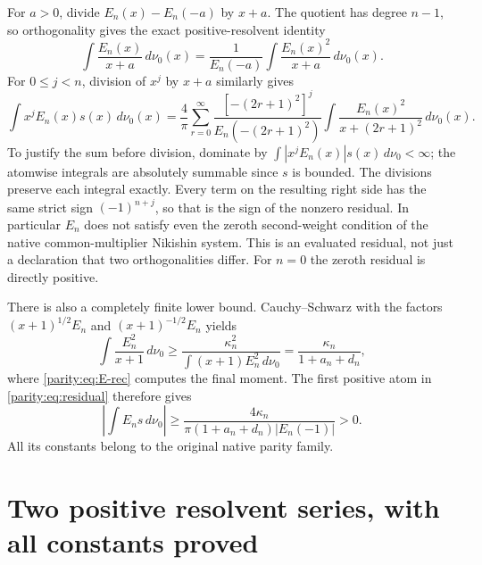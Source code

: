 For $a>0$, divide $E_n(x)-E_n(-a)$ by $x+a$. The quotient has
degree $n-1$, so orthogonality gives the exact positive-resolvent
identity
\begin{equation}\label{parity:eq:residual-atom}
 \int\frac{E_n(x)}{x+a}\,d\nu_0(x)
  =\frac1{E_n(-a)}\int\frac{E_n(x)^2}{x+a}\,d\nu_0(x).
\end{equation}
For $0\leq j<n$, division of $x^j$ by $x+a$ similarly gives
\begin{equation}\label{parity:eq:residual}
 \int x^jE_n(x)s(x)\,d\nu_0(x)
 =\frac4\pi\sum_{r=0}^{\infty}
 \frac{[-(2r+1)^2]^j}{E_n(-(2r+1)^2)}
 \int\frac{E_n(x)^2}{x+(2r+1)^2}\,d\nu_0(x).
\end{equation}
To justify the sum before division, dominate by
$\int|x^jE_n(x)|s(x)\,d\nu_0<\infty$; the atomwise integrals are
absolutely summable since $s$ is bounded. The divisions preserve
each integral exactly. Every term on the resulting right side
has the same strict sign $(-1)^{n+j}$, so that is the sign of the
nonzero residual. In particular $E_n$ does not satisfy even the
zeroth second-weight condition of the native common-multiplier
Nikishin system. This is an evaluated residual, not just a
declaration that two orthogonalities differ. For $n=0$ the
zeroth residual is directly positive.

There is also a completely finite lower bound. Cauchy--Schwarz
with the factors $(x+1)^{1/2}E_n$ and $(x+1)^{-1/2}E_n$ yields
\[
 \int\frac{E_n^2}{x+1}\,d\nu_0
 \geq\frac{\kappa_n^2}{\int(x+1)E_n^2\,d\nu_0}
 =\frac{\kappa_n}{1+a_n+d_n},
\]
where \eqref{parity:eq:E-rec} computes the final moment. The first
positive atom in \eqref{parity:eq:residual} therefore gives
\begin{equation}\label{parity:eq:residual-lower}
 \left|\int E_n s\,d\nu_0\right|
 \geq\frac{4\kappa_n}{\pi(1+a_n+d_n)|E_n(-1)|}>0.
\end{equation}
All its constants belong to the original native parity family.

\section{Two positive resolvent series, with all constants proved}

